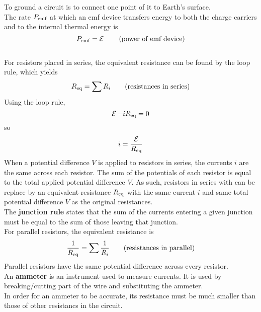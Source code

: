 \documentclass[./Electricity and Magnetism.tex]{subfiles}
\begin{document}
		To ground a circuit is to connect one point of it to Earth's surface. \\
		The rate \(P_{\text{emf}}\) at which an emf device transfers energy to both the charge carriers and to the internal thermal energy is
			\[P_{\text{emf}} = \operatorname{\mathcal{E}} \tag{power of emf device}\] \\
		For resistors placed in series, the equivalent resistance can be found by the loop rule, which yields
			\[R_{\text{eq}} = \sum R_i \tag{resistances in series}\]
			Using the loop rule,
			\[\operatorname{\mathcal{E}} - iR_{\text{eq}} = 0\]
			so
			\[i = \frac{\operatorname{\mathcal{E}}}{R_{\text{eq}}}\]
			When a potential difference \(V\) is applied to resistors in series, the currents \(i\) are the same across each resistor. The sum of the potentials of each resistor is equal to the total applied potential difference \(V\). As such, resistors in series with can be replace by an equivalent resistance \(R_{\text{eq}}\) with the same current \(i\) and same total potential difference \(V\) as the original resistances. \\
		The \textbf{junction rule} states that the sum of the currents entering a given junction must be equal to the sum of those leaving that junction. \\
		For parallel resistors, the equivalent resistance is
			\[\frac{1}{R_{\text{eq}}} = \sum \frac{1}{R_i} \tag{resistances in parallel}\]
			Parallel resistors have the same potential difference across every resistor. \\
		An \textbf{ammeter} is an instrument used to measure currents. It is used by breaking/cutting part of the wire and substituting the ammeter. \\
			In order for an ammeter to be accurate, its resistance must be much smaller than those of other resistancs in the circuit.
\end{document}
